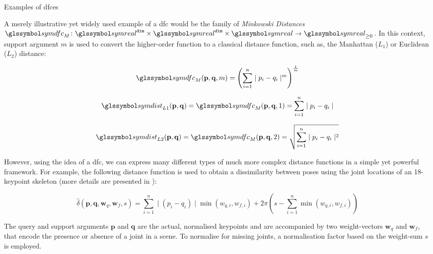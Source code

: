 \begin{example}[label=example:dfc]{Examples of \acrlong{dfc}es}{}

    A merely illustrative yet widely used example of a \acrshort{dfc} would be the family of \emph{Minkowski Distances} $\symdfc_{M} \colon \symreal^{\mathtt{dim}} \times \symreal^{\mathtt{dim}} \times \symreal \to \symreal_{\geq 0}$. In this context, support argument $m$ is used to convert the higher-order function to a classical distance function, such as, the Manhattan ($L_1$) or Euclidean ($L_2$) distance:

    \begin{equation}
        \symdfc_{M}(\mathbf{p},\mathbf{q},m) = \left(\sum_{i=1}^{n} \mid p_i - q_i \mid^m\right)^{\frac{1}{m}}
    \end{equation}
    
    \begin{equation}
       \symdist_{L1}(\mathbf{p},\mathbf{q}) = \symdfc_M(\mathbf{p},\mathbf{q}, 1) = \sum_{i=1}^{n} \mid p_i - q_i \mid
    \end{equation}
    
    \begin{equation}
       \symdist_{L2}(\mathbf{p},\mathbf{q}) =\symdfc_M(\mathbf{p},\mathbf{q}, 2) = \sqrt{\sum_{i=1}^{n} \mid p_i - q_i \mid^2}
    \end{equation}
    
    However, using the idea of a \acrshort{dfc}, we can express many different types of much more complex distance functions in a simple yet powerful framework. For example, the following distance function is used to obtain a dissimilarity between poses using the joint locations of an 18-keypoint skeleton (more details are presented in \cite{Heller:2022Multi}):

    \begin{equation}
        \hat{\delta}(\mathbf{p},\mathbf{q},\mathbf{w}_q,\mathbf{w}_f, s) = \sum_{i=1}^{n} \mid (p_i - q_i) \mid \min(w_{q,i}, w_{f,i}) + 2\pi (s - \sum_{i=1}^{n} \min(w_{q,i}, w_{f,i}))
    \end{equation}

    The query and support arguments $\mathbf{p}$ and $\mathbf{q}$ are the actual, normalised keypoints and are accompanied by two weight-vectors $\mathbf{w}_q$ and $\mathbf{w}_f$, that encode the presence or absence of a joint in a scene. To normalise for missing joints, a normalisation factor based on the weight-sum $s$ is employed.
\end{example}


